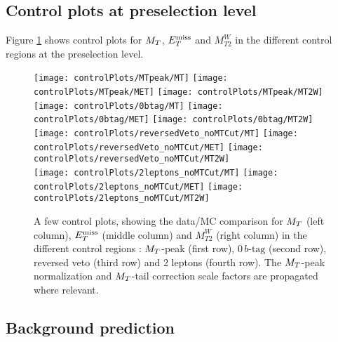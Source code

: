         \subsection{Control plots at preselection level}

        Figure \ref{fig:preselControlPlots} shows control plots for $M_T$, $E_T^\text{miss}$ and $M_{T2}^W$ in the different control regions at the preselection level. 

            \begin{figure}[h!]
                \centering
                \texttt{[image: controlPlots/MTpeak/MT]}
                \texttt{[image: controlPlots/MTpeak/MET]}
                \texttt{[image: controlPlots/MTpeak/MT2W]}\\
                \texttt{[image: controlPlots/0btag/MT]}
                \texttt{[image: controlPlots/0btag/MET]}
                \texttt{[image: controlPlots/0btag/MT2W]}\\
                \texttt{[image: controlPlots/reversedVeto\_noMTCut/MT]}
                \texttt{[image: controlPlots/reversedVeto\_noMTCut/MET]}
                \texttt{[image: controlPlots/reversedVeto\_noMTCut/MT2W]}\\
                \texttt{[image: controlPlots/2leptons\_noMTCut/MT]}
                \texttt{[image: controlPlots/2leptons\_noMTCut/MET]}
                \texttt{[image: controlPlots/2leptons\_noMTCut/MT2W]}\\
                \caption{A few control plots, showing the data/MC comparison for $M_T$ (left column), 
                        $E_T^\text{miss}$ (middle column) and $M_{T2}^W$ (right column) in the different control
                        regions : $M_T$-peak (first row), $0\, b\text{-tag}$ (second row), reversed veto (third
                        row) and 2 leptons (fourth row). The $M_T$-peak normalization and $M_T$-tail
                        correction scale factors are propagated where relevant.}
                        \label{fig:preselControlPlots}
            \end{figure}

        \subsection{Background prediction}

